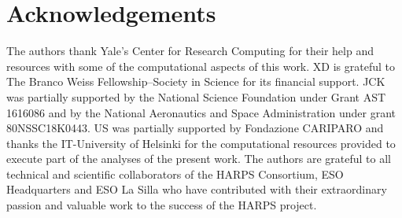 \documentclass{aa}
\begin{document}

\section{Acknowledgements}

The authors thank Yale's Center for Research Computing for their help and resources with some of the computational aspects of this work.
XD is grateful to The Branco Weiss Fellowship--Society in Science for its financial support.
JCK was partially supported by the National Science Foundation under Grant AST 1616086 and by the National Aeronautics and Space Administration under grant 80NSSC18K0443.
US was partially supported by Fondazione CARIPARO and thanks the IT-University of Helsinki for the computational resources provided to execute part of the analyses of the present work.
The authors are grateful to all technical and scientific collaborators of the HARPS Consortium, ESO Headquarters and ESO La Silla who have contributed with their extraordinary passion and valuable work to the success of the HARPS project.
\end{document}

